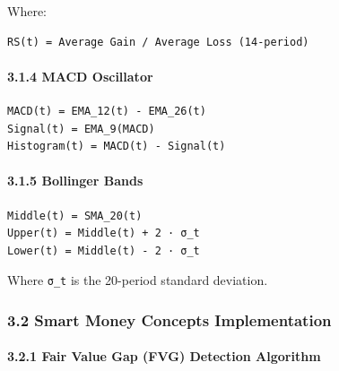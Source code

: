 Where:

\begin{verbatim}
RS(t) = Average Gain / Average Loss (14-period)
\end{verbatim}

\paragraph{3.1.4 MACD Oscillator}\label{macd-oscillator}

\begin{verbatim}
MACD(t) = EMA_12(t) - EMA_26(t)
Signal(t) = EMA_9(MACD)
Histogram(t) = MACD(t) - Signal(t)
\end{verbatim}

\paragraph{3.1.5 Bollinger Bands}\label{bollinger-bands}

\begin{verbatim}
Middle(t) = SMA_20(t)
Upper(t) = Middle(t) + 2 · σ_t
Lower(t) = Middle(t) - 2 · σ_t
\end{verbatim}

Where \texttt{σ\_t} is the 20-period standard deviation.

\subsubsection{3.2 Smart Money Concepts
Implementation}\label{smart-money-concepts-implementation}

\paragraph{3.2.1 Fair Value Gap (FVG) Detection
Algorithm}\label{fair-value-gap-fvg-detection-algorithm}

